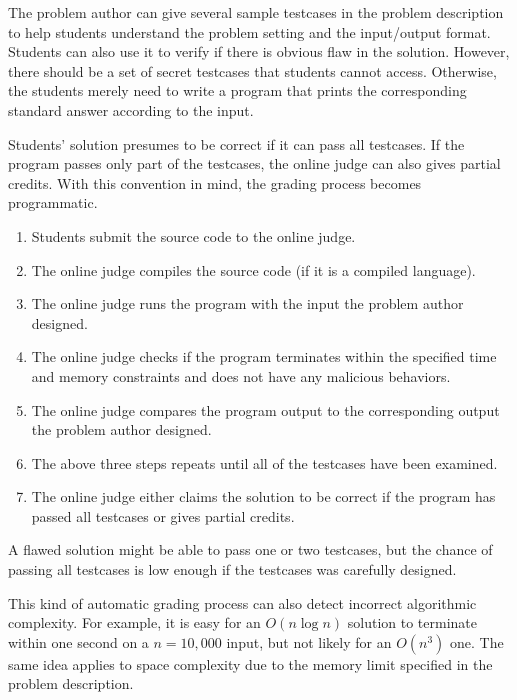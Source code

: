             The problem author can give several sample testcases in the problem description
            to help students understand the problem setting and the input/output format.
            Students can also use it to verify if there is obvious flaw in the solution.
            However, there should be a set of secret testcases that students cannot access.
            Otherwise, the students merely need to write a program that prints the corresponding
            standard answer according to the input.

            Students' solution presumes to be correct if it can pass all testcases.
            If the program passes only part of the testcases, the online judge can also gives partial credits.
            With this convention in mind, the grading process becomes programmatic.

            \begin{enumerate}
                \item Students submit the source code to the online judge.
                \item The online judge compiles the source code (if it is a compiled language).
                \item The online judge runs the program with the input the problem author designed.
                \item The online judge checks if the program terminates within the specified
                      time and memory constraints and does not have any malicious behaviors.
                \item The online judge compares the program output to the corresponding output
                      the problem author designed.
                \item The above three steps repeats until all of the testcases have been examined.
                \item The online judge either claims the solution to be correct if the program
                      has passed all testcases or gives partial credits.
            \end{enumerate}

            A flawed solution might be able to pass one or two testcases, but the chance of
            passing all testcases is low enough if the testcases was carefully designed.

            This kind of automatic grading process can also detect incorrect algorithmic complexity.
            For example, it is easy for an $O(n\log n)$ solution to terminate within one second
            on a $n=10,000$ input, but not likely for an $O(n^3)$ one.
            The same idea applies to space complexity due to the memory limit
            specified in the problem description.

